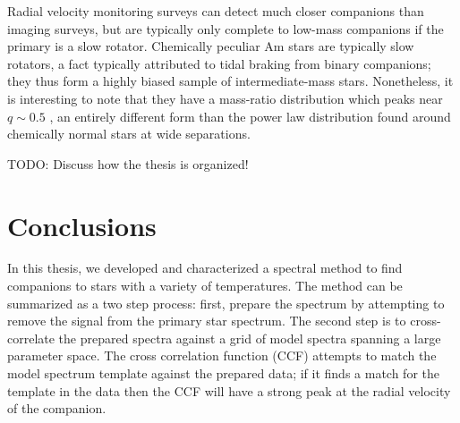 \documentclass{utthesis}
\begin{document}
Radial velocity monitoring surveys can detect much closer companions than imaging surveys, but are typically only complete to low-mass companions if the primary is a slow rotator. Chemically peculiar Am stars are typically slow rotators, a fact typically attributed to tidal braking from binary companions; they thus form a highly biased sample of intermediate-mass stars. Nonetheless, it is interesting to note that they have a mass-ratio distribution which peaks near $q \sim 0.5$ \citep{Vuissoz2004}, an entirely different form than the power law distribution found around chemically normal stars at wide separations.

TODO: Discuss how the thesis is organized!

























\chapter{Conclusions}

In this thesis, we developed and characterized a spectral method to find companions to stars with a variety of temperatures. The method can be summarized as a two step process: first, prepare the spectrum by attempting to remove the signal from the primary star spectrum. The second step is to cross-correlate the prepared spectra against a grid of model spectra spanning a large parameter space. The cross correlation function (CCF) attempts to match the model spectrum template against the prepared data; if it finds a match for the template in the data then the CCF will have a strong peak at the radial velocity of the companion.
\end{document}
